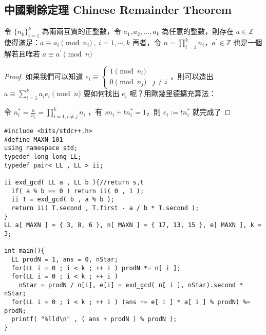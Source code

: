 \subsection{中國剩餘定理 Chinese Remainder Theorem}
\label{sec:mod:CRT}

\begin{theorem}[中國剩餘定理]
令 $\{n_k\}^k_{i=1}$ 為兩兩互質的正整數，令 $a_1,a_2,...,a_k$ 為任意的整數，則存在 $a\in\mathbb{Z}$ 使得滿足：$a\equiv a_i \pmod {n_i} \ ,\ i=1,\cdots ,k$
再者，令 $n={\prod_{i=1}^k n_i}$，$a^{'}\in\mathbb{Z}$ 也是一個解若且唯若 $a \equiv a^{'} \pmod n$
\end{theorem}
\begin{proof}
如果我們可以知道 $e_i\equiv\begin{cases} 1 \pmod {n_i} &  \\ 0 \pmod {n_j} &  j\neq i \end{cases}$，則可以造出 $a\equiv\sum_{i=1}^k a_ie_i\pmod n$
要如何找出 $e_i$ 呢？用歐幾里德擴充算法：

令 $n_i^*=\frac n {n_i}=\prod_{i=1,i\neq j}^kn_i$ ，有 $sn_i+tn_i^*=1$，則 $e_i:=tn_i^*$ 就完成了
\end{proof}

\begin{lstlisting}[caption=測試中國剩餘定理]
#include <bits/stdc++.h>
#define MAXN 101
using namespace std;
typedef long long LL;
typedef pair< LL , LL > ii;

ii exd_gcd( LL a , LL b ){//return s,t
  if( a % b == 0 ) return ii( 0 , 1 );
  ii T = exd_gcd( b , a % b );
  return ii( T.second , T.first - a / b * T.second );
}
LL a[ MAXN ] = { 3, 8, 6 }, n[ MAXN ] = { 17, 13, 15 }, e[ MAXN ], k = 3;

int main(){
  LL prodN = 1, ans = 0, nStar;
  for(LL i = 0 ; i < k ; ++ i ) prodN *= n[ i ];
  for(LL i = 0 ; i < k ; ++ i )
    nStar = prodN / n[i], e[i] = exd_gcd( n[ i ], nStar).second * nStar;
  for(LL i = 0 ; i < k ; ++ i ) (ans += e[ i ] * a[ i ] % prodN) %= prodN;
  printf( "%lld\n" , ( ans + prodN ) % prodN );
}
\end{lstlisting}

